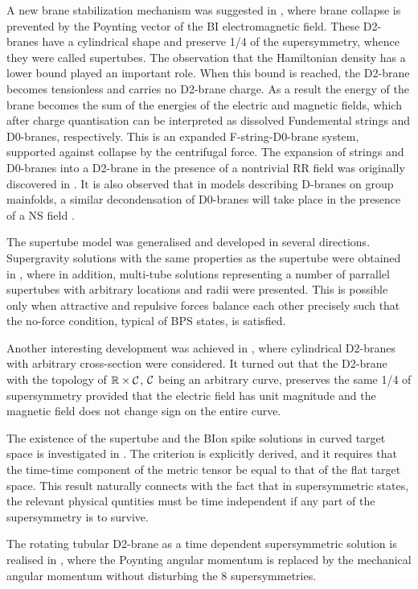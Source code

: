 \documentclass[a4paper,12pt]{article}
\begin{document}
A new brane stabilization mechanism was suggested in \cite{tub}, where brane collapse is prevented by the Poynting vector of the BI electromagnetic field. These D2-branes have a cylindrical shape and preserve 1/4 of the supersymmetry, whence they were called supertubes. The observation that the Hamiltonian density has a lower bound played an important role. When this bound is reached, the D2-brane becomes tensionless and carries no D2-brane charge. As a result the energy of the brane becomes the sum of the energies of the electric and magnetic fields, which after charge quantisation can be interpreted as dissolved Fundemental strings and D0-branes, respectively. This is an expanded F-string-D0-brane system, supported against collapse by the centrifugal force. The expansion of strings and D0-branes into a D2-brane in the presence of a nontrivial RR field was originally discovered in \cite{tunl,my}. It is also observed that in models describing D-branes on group mainfolds, a similar decondensation of D0-branes will take place in the presence of a NS field \cite{bach,tay,my2}.

The supertube model was generalised and developed in several directions. Supergravity solutions with the same properties as the supertube were obtained in \cite{emt}, where in addition, multi-tube solutions representing a number of parrallel supertubes with arbitrary locations and radii were presented. This is possible only when attractive and repulsive forces balance each other precisely such that the no-force condition, typical of BPS states, is satisfied. 

Another interesting development was achieved in \cite{bak1}, where cylindrical D2-branes with arbitrary cross-section were considered. It turned out that the D2-brane with the topology of $\mathbb{R}\times{\cal C}$, ${\cal C}$ being an arbitrary curve, preserves the same 1/4 of supersymmetry provided that the electric field has unit magnitude and the magnetic field does not change sign on the entire curve.

The existence of the supertube and the BIon spike solutions in curved target space is investigated in \cite{cts}. The criterion is explicitly derived, and it requires that the time-time component of the metric tensor be equal to that of the flat target space. This result naturally connects with the fact that in supersymmetric states, the relevant physical quntities must be time independent if any part of the supersymmetry is to survive.

The rotating tubular D2-brane as a time dependent supersymmetric solution is realised in \cite{rot}, where the Poynting angular momentum is replaced by the mechanical angular momentum without disturbing the 8 supersymmetries.
 
\end{document}
